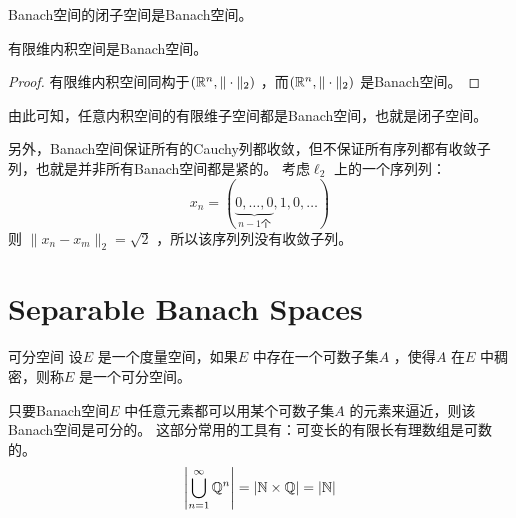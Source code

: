 \begin{theorem}{}
    Banach空间的闭子空间是Banach空间。
\end{theorem}

\begin{theorem}{}
    有限维内积空间是Banach空间。
\end{theorem}

\begin{proof}
    有限维内积空间同构于\((\mathbb{R}^{n} , \|\cdot\|_{2})\) ，而\((\mathbb{R}^{n} ,
    \|\cdot\|_{2})\) 是Banach空间。
\end{proof}

由此可知，任意内积空间的有限维子空间都是Banach空间，也就是闭子空间。

另外，Banach空间保证所有的Cauchy列都收敛，但不保证所有序列都有收敛子列，也就是并非所有Banach空间都是紧的。
考虑\(\ell_{2}\) 上的一个序列列：
\[
    x_{n} = (\underbrace{0,\ldots,0}_{n-1\text{个}} ,1,0,\ldots )
\]
则  \(\|x_{n}-x_{m}\|_{2} = \sqrt{2}\) ，所以该序列列没有收敛子列。

\section{Separable Banach Spaces}
\begin{definition}{可分空间}
    设\(E\) 是一个度量空间，如果\(E\) 中存在一个可数子集\(A\) ，使得\(A\) 在\(E\) 中稠密，则称\(E\) 是一个可分空间。
\end{definition}

只要Banach空间\(E\) 中任意元素都可以用某个可数子集\(A\) 的元素来逼近，则该Banach空间是可分的。
这部分常用的工具有：可变长的有限长有理数组是可数的。\[
    \left|\bigcup_{n=1}^{\infty} \mathbb{Q}^{n}\right| = \left|\mathbb{N}
    \times \mathbb{Q}\right| = \left|\mathbb{N}\right|
\]

